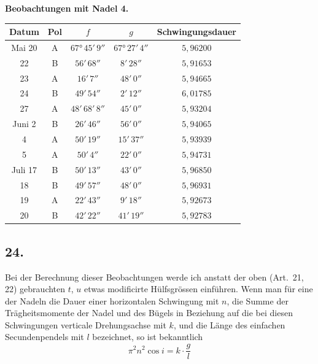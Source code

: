 \documentclass[12pt,a4paper]{article}
\begin{document}
\begin{center}
\small
\textbf{Beobachtungen mit Nadel 4.}
\begin{tabular}{c|c|c|c|c}
\hline
Datum & Pol & $f$ & $g$ & Schwingungsdauer \\
\hline
Mai 20 & A & $67°\,45'\,9''$ & $67°\,27'\,4''$ & $5{,}96200$ \\
22 & B & $56'\,68''$ & $8'\,28''$ & $5{,}91653$ \\
23 & A & $16'\,7''$ & $48'\,0''$ & $5{,}94665$ \\
24 & B & $49'\,54''$ & $2'\,12''$ & $6{,}01785$ \\
27 & A & $48'\,68'\,8''$ & $45'\,0''$ & $5{,}93204$ \\
Juni 2 & B & $26'\,46''$ & $56'\,0''$ & $5{,}94065$ \\
4 & A & $50'\,19''$ & $15'\,37''$ & $5{,}93939$ \\
5 & A & $50'\,4''$ & $22'\,0''$ & $5{,}94731$ \\
Juli 17 & B & $50'\,13''$ & $43'\,0''$ & $5{,}96850$ \\
18 & B & $49'\,57''$ & $48'\,0''$ & $5{,}96931$ \\
19 & A & $22'\,43''$ & $9'\,18''$ & $5{,}92673$ \\
20 & B & $42'\,22''$ & $41'\,19''$ & $5{,}92783$ \\
\hline
\end{tabular}
\end{center}

\subsection*{24.}
Bei der Berechnung dieser Beobachtungen werde ich anstatt der oben (Art.~21, 22) gebrauchten $t$, $u$ etwas modificirte Hülfsgrössen einführen. Wenn man für eine der Nadeln die Dauer einer horizontalen Schwingung mit $n$, die Summe der Trägheitsmomente der Nadel und des Bügels in Beziehung auf die bei diesen Schwingungen verticale Drehungsachse mit $k$, und die Länge des einfachen Secundenpendels mit $l$ bezeichnet, so ist bekanntlich
\[ \pi^2 n^2 \cos i = k \cdot \frac{g}{l} \]
\end{document}
